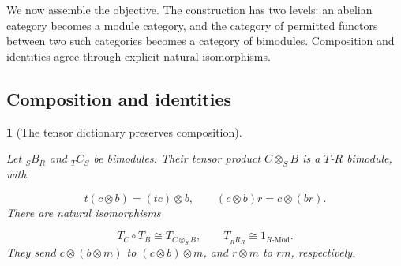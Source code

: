\documentclass[11pt,a4paper]{article}
\newcommand{\mathheading}{}
\theoremstyle{plain}
\newtheorem*{plainstatement}{\mathheading}
\theoremstyle{definition}
\newenvironment{mathstatement}[3]{\renewcommand{\mathheading}{#1 #2}\begin{plainstatement}[#3]}{\end{plainstatement}}
\begin{document}
We now assemble the objective. The construction has two levels: an abelian category becomes a module category, and the category of permitted functors between two such categories becomes a category of bimodules. Composition and identities agree through explicit natural isomorphisms.

 
\subsection{Composition and identities}
\label{composition}
 
\begin{mathstatement}{Theorem}{10.1}{The tensor dictionary preserves composition}
\label{env-10-1}

Let \({}_S B_R\) and \({}_T C_S\) be bimodules. Their tensor product \(C\otimes_S B\) is a \(T\)-\(R\) bimodule, with

 \[t(c\otimes b)=(tc)\otimes b,\qquad(c\otimes b)r=c\otimes(br).\] 
There are natural isomorphisms

 \[T_C\circ T_B\cong T_{C\otimes_S B},\qquad T_{{}_R R_R}\cong1_{R\text{-Mod}}.\] 
They send \(c\otimes(b\otimes m)\) to \((c\otimes b)\otimes m\), and \(r\otimes m\) to \(rm\), respectively.


\par{}\par

\end{mathstatement}
 
\end{document}

